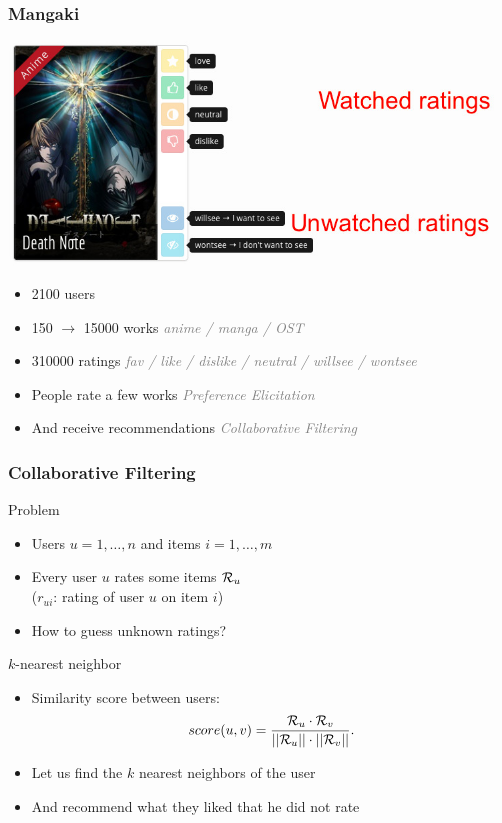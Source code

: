 \documentclass[handout]{beamer}
\begin{document}
\newcommand\discrete[1]{\textcolor{gray}{\hfill {\em \small #1}}}

\begin{frame}
	\frametitle{Mangaki}
    \includegraphics[width=\textwidth]{figures/ratings.jpg}
	\begin{itemize}
	\item 2100 users
	\item 150 $\rightarrow$ 15000 works \discrete{anime / manga / OST}
	\item 310000 ratings \discrete{fav / like / dislike / neutral / willsee / wontsee}
	\item People rate a few works \discrete{Preference Elicitation}
  \item And receive recommendations \discrete{Collaborative Filtering}
	\end{itemize}
\end{frame}

\begin{frame}
	\frametitle{Collaborative Filtering}
	\begin{block}{Problem}
		\begin{itemize}[<+->]
		\item Users $u = 1, \ldots, n$ and items $i = 1, \ldots, m$
		\item Every user $u$ rates some items $\mathcal{R}_u$\\(\alert{$r_{ui}$}: rating of user $u$ on item $i$)
        \item How to guess unknown ratings?
		\end{itemize}
	\end{block}
	\pause
	\begin{exampleblock}{$k$-nearest neighbor}
        \begin{itemize}
        \item Similarity score between users:
        \[ score(u, v) = \frac{\mathcal{R}_u \cdot \mathcal{R}_v}{||\mathcal{R}_u|| \cdot ||\mathcal{R}_v||}. \]
        \item Let us find the $k$ nearest neighbors of the user
        \item And recommend what they liked that he did not rate
        \end{itemize}
	\end{exampleblock}
\end{frame}
\end{document}
